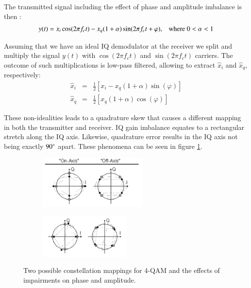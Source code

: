 \documentclass[12pt,a4paper,openright]{report}
\begin{document}
The transmitted signal including the effect of phase and amplitude imbalance is then \cite{Madhow}:
\begin{equation}\label{MQAM impaired rcvd signal}
y(t) = {x_i}\cos (2\pi {f_c}t) - {x_q}(1 + \alpha )\sin (2\pi {f_c}t + \varphi ) \text{,\quad where 0} < \text{$\alpha$} < \text{1}
\end{equation}

Assuming that we have an ideal IQ demodulator at the receiver we split and multiply the signal $y(t)$ with $\cos (2\pi {f_c}t)$  and $\sin (2\pi {f_c}t)$ carriers. The outcome of such multiplications is low-pass filtered, allowing to extract  $\hat{x}_i$ and $\hat{x}_q$, respectively:
\begin{eqnarray}
{{\hat x}_i} & = & \frac{1}{2}\left[ {{x_i} - {x_q}(1 + \alpha )\sin (\varphi )} \right]\\
{{\hat x}_q} & = & \frac{1}{2}\left[ {{x_q}(1 + \alpha )\cos (\varphi )} \right]
\end{eqnarray}

These non-idealities leads to a quadrature skew that causes a different mapping in both the transmitter and receiver. IQ gain imbalance equates to a rectangular stretch along the IQ axis. Likewise, quadrature error results in the IQ axis not being exactly $90\degree$ apart. These phenomena can be seen in figure \ref{fig:skewed}.


\begin{figure}[H]
 \centering
	\begin{subfigure}[H]{0.9\textwidth}
 	\centering
    \includegraphics[width=0.6\textwidth]{gi.pdf}

	\end{subfigure}
	
	\begin{subfigure}[H]{0.9\textwidth}
 	\centering
    \includegraphics[width=0.5\textwidth]{qe.pdf}
 	\end{subfigure}
    \caption[Two possible constellation mapping for 4-QAM]{Two possible constellation mappings for 4-QAM and the effects of impairments on phase and amplitude\cite{Agilent IQ paper}.}
    \label{fig:skewed}
\end{figure}
\end{document}
